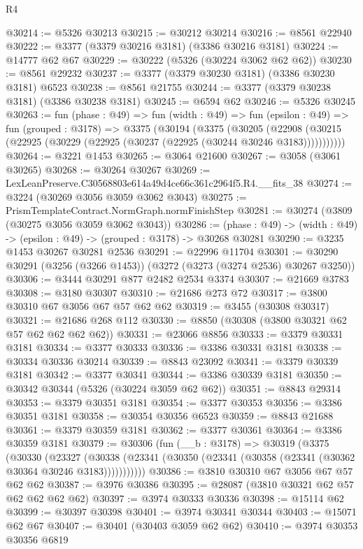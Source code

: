 \begin{lexlean}{R4}
\begin{coremodule}
@30214 := @5326 @30213
@30215 := @30212 @30214
@30216 := @8561 @22940
@30222 := @3377 (@3379 @30216 @3181) (@3386 @30216 @3181)
@30224 := @14777 @62 @67
@30229 := @30222 (@5326 (@30224 @3062 @62 @62))
@30230 := @8561 @29232
@30237 := @3377 (@3379 @30230 @3181) (@3386 @30230 @3181) @6523
@30238 := @8561 @21755
@30244 := @3377 (@3379 @30238 @3181) (@3386 @30238 @3181)
@30245 := @6594 @62
@30246 := @5326 @30245
@30263 := fun (phase : @49) =>
  fun (width : @49) =>
  fun (epsilon : @49) =>
  fun (grouped : @3178) =>
  @3375
    (@30194
      (@3375
        (@30205
          (@22908 (@30215 (@22925 (@30229 (@22925 (@30237 (@22925 (@30244 @30246 @3183)))))))))))
@30264 := @3221 @1453
@30265 := @3064 @21600
@30267 := @3058 (@3061 @30265)
@30268 := @30264 @30267
@30269 := LexLeanPreserve.C30568803e614a49d4ce66c361c2964f5.R4.__fits_38
@30274 := @3224 (@30269 @3056 @3059 @3062 @3043)
@30275 := PrismTemplateContract.NormGraph.normFinishStep
@30281 := @30274 (@3809 (@30275 @3056 @3059 @3062 @3043))
@30286 := (phase : @49) -> (width : @49) -> (epsilon : @49) -> (grouped : @3178) -> @30268 @30281
@30290 := @3235 @1453 @30267 @30281 @2536
@30291 := @22996 @11704
@30301 := @30290 @30291 (@3256 (@3266 @1453)) (@3272 (@3273 (@3274 @2536) @30267 @3250))
@30306 := @3444 @30291 @877 @2482 @2534 @3374
@30307 := @21669 @3783
@30308 := @3180 @30307
@30310 := @21686 @273 @72
@30317 := @3800 @30310 @67 @3056 @67 @57 @62 @62
@30319 := @3455 (@30308 @30317)
@30321 := @21686 @268 @112
@30330 := @8850 (@30308 (@3800 @30321 @62 @57 @62 @62 @62 @62))
@30331 := @23066 @8856
@30333 := @3379 @30331 @3181
@30334 := @3377 @30333
@30336 := @3386 @30331 @3181
@30338 := @30334 @30336 @30214
@30339 := @8843 @23092
@30341 := @3379 @30339 @3181
@30342 := @3377 @30341
@30344 := @3386 @30339 @3181
@30350 := @30342 @30344 (@5326 (@30224 @3059 @62 @62))
@30351 := @8843 @29314
@30353 := @3379 @30351 @3181
@30354 := @3377 @30353
@30356 := @3386 @30351 @3181
@30358 := @30354 @30356 @6523
@30359 := @8843 @21688
@30361 := @3379 @30359 @3181
@30362 := @3377 @30361
@30364 := @3386 @30359 @3181
@30379 := @30306
    (fun (__b : @3178) =>
    @30319
      (@3375
        (@30330
          (@23327
            (@30338 (@23341 (@30350 (@23341 (@30358 (@23341 (@30362 @30364 @30246 @3183)))))))))))
@30386 := @3810 @30310 @67 @3056 @67 @57 @62 @62
@30387 := @3976 @30386
@30395 := @28087 (@3810 @30321 @62 @57 @62 @62 @62 @62)
@30397 := @3974 @30333 @30336
@30398 := @15114 @62
@30399 := @30397 @30398
@30401 := @3974 @30341 @30344
@30403 := @15071 @62 @67
@30407 := @30401 (@30403 @3059 @62 @62)
@30410 := @3974 @30353 @30356 @6819

\end{coremodule}
\end{lexlean}
